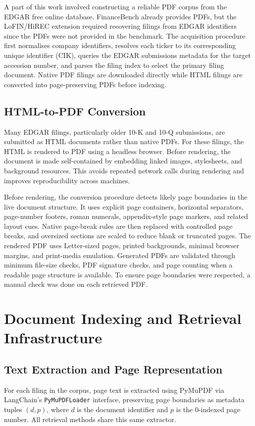 \documentclass[12pt,twoside,maitrise]{dms}
\theoremstyle{definition}
\numberwithin{equation}{section}
\numberwithin{table}{chapter}
\numberwithin{figure}{chapter}
\begin{document}
A part of this work involved constructing a reliable PDF corpus from the EDGAR free
online database. FinanceBench already provides PDFs, but the LoFIN/HiREC extension
required recovering filings from EDGAR identifiers since the PDFs were not provided in
the benchmark. The acquisition procedure first normalises company identifiers, resolves
each ticker to its corresponding unique identifier (CIK), queries the EDGAR submissions
metadata for the target accession number, and parses the filing index to select the
primary filing document. Native PDF filings are downloaded directly while HTML filings are
converted into page-preserving PDFs before indexing.

\subsection{HTML-to-PDF Conversion}
\label{sec:html_pdf_conversion}

Many EDGAR filings, particularly older 10-K and 10-Q submissions, are submitted as HTML
documents rather than native PDFs. For these filings, the HTML is rendered to PDF using
a headless browser. Before rendering, the document is made self-contained by embedding
linked images, stylesheets, and background resources. This avoids repeated network calls
during rendering and improves reproducibility across machines.

Before rendering, the conversion procedure detects likely page boundaries in the live
document structure. It uses explicit page containers, horizontal separators,
page-number footers, roman numerals, appendix-style page markers, and related layout
cues. Native page-break rules are then replaced with controlled page breaks, and
oversized sections are scaled to reduce blank or truncated pages. The rendered PDF uses
Letter-sized pages, printed backgrounds, minimal browser margins, and print-media
emulation. Generated PDFs are validated through minimum file-size checks, PDF signature
checks, and page counting when a readable page structure is available. To ensure page
boundaries were respected, a manual check was done on each retrieved PDF.


\section{Document Indexing and Retrieval Infrastructure}
\label{sec:indexing}

\subsection{Text Extraction and Page Representation}
\label{text_ext}
For each filing in the corpus, page text is extracted using PyMuPDF via LangChain's
\texttt{PyMuPDFLoader} interface, preserving page boundaries as metadata tuples
$(d, p)$, where $d$ is the document identifier and $p$ is the 0-indexed page number.
All retrieval methods share this same extractor.
\end{document}
